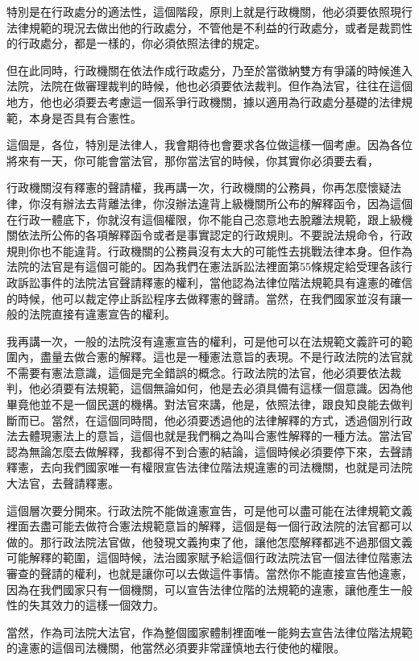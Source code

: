 \documentclass[oneside,sub3section]{ctexbook}
\begin{document}
特別是在行政處分的適法性，這個階段，原則上就是行政機關，他必須要依照現行法律規範的現況去做出他的行政處分，不管他是不利益的行政處分，或者是裁罰性的行政處分，都是一樣的，你必須依照法律的規定。

但在此同時，行政機關在依法作成行政處分，乃至於當徵納雙方有爭議的時候進入法院，法院在做審理裁判的時候，他也必須要依法裁判。但作為法官，往往在這個地方，他也必須要去考慮這一個系爭行政機關，據以適用為行政處分基礎的法律規範，本身是否具有合憲性。

這個是，各位，特別是法律人，我會期待也會要求各位做這樣一個考慮。因為各位將來有一天，你可能會當法官，那你當法官的時候，你其實你必須要去看，

行政機關沒有釋憲的聲請權，我再講一次，行政機關的公務員，你再怎麼懷疑法律，你沒有辦法去背離法律，你沒辦法違背上級機關所公布的解釋函令，因為這個在行政一體底下，你就沒有這個權限，你不能自己恣意地去脫離法規範，跟上級機關依法所公佈的各項解釋函令或者是事實認定的行政規則。不要說法規命令，行政規則你也不能違背。行政機關的公務員沒有太大的可能性去挑戰法律本身。但作為法院的法官是有這個可能的。因為我們在憲法訴訟法裡面第55條規定給受理各該行政訴訟事件的法院法官聲請釋憲的權利，當他認為法律位階法規範具有違憲的確信的時候，他可以裁定停止訴訟程序去做釋憲的聲請。當然，在我們國家並沒有讓一般的法院直接有違憲宣告的權利。

我再講一次，一般的法院沒有違憲宣告的權利，可是他可以在法規範文義許可的範圍內，盡量去做合憲的解釋。這也是一種憲法意旨的表現。不是行政法院的法官就不需要有憲法意識，這個是完全錯誤的概念。行政法院的法官，他必須要依法裁判，他必須要有法規範，這個無論如何，他是去必須具備有這樣一個意識。因為他畢竟他並不是一個民選的機構。對法官來講，他是，依照法律，跟良知良能去做判斷而已。當然，在這個同時間，他必須要透過他的法律解釋的方式，透過個別行政法去體現憲法上的意旨，這個也就是我們稱之為叫合憲性解釋的一種方法。當法官認為無論怎麼去做解釋，我都得不到合憲的結論，這個時候必須要停下來，去聲請釋憲，去向我們國家唯一有權限宣告法律位階法規違憲的司法機關，也就是司法院大法官，去聲請釋憲。

這個層次要分開來。行政法院不能做違憲宣告，可是他可以盡可能在法律規範文義裡面去盡可能去做符合憲法規範意旨的解釋，這個是每一個行政法院的法官都可以做的。那行政法院法官做，他發現文義拘束了他，讓他怎麼解釋都逃不過那個文義可能解釋的範圍，這個時候，法治國家賦予給這個行政法院法官一個法律位階憲法審查的聲請的權利，也就是讓你可以去做這件事情。當然你不能直接宣告他違憲，因為在我們國家只有一個機關，可以宣告法律位階的法規範的違憲，讓他產生一般性的失其效力的這樣一個效力。

當然，作為司法院大法官，作為整個國家體制裡面唯一能夠去宣告法律位階法規範的違憲的這個司法機關，他當然必須要非常謹慎地去行使他的權限。
\end{document}

